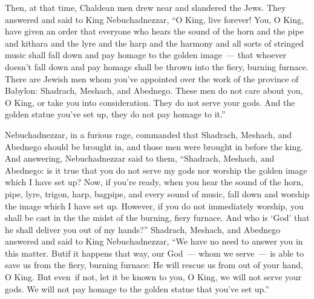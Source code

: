 \begin{inparaenum}
   Then, at that time, Chaldean men drew near and slandered the Jews.%
   They answered and said to King Nebuchadnezzar, ``O King, live forever!%
   You, O King, have given an order that everyone who hears the sound of the horn and the pipe and kithara and the lyre and the harp and the harmony and all sorts of stringed music shall fall down and pay homage to the golden image~---%
   that whoever doesn't fall down and pay homage shall be thrown into the fiery, burning furnace.%
   There are Jewish men whom you've appointed over the work of the province of Babylon: Shadrach, Meshach, and Abednego. These men do not care about you, O King, or take you into consideration. They do not serve your gods. And the golden statue you've set up, they do not pay homage to it.''\understood%
  
   Nebuchadnezzar, in a furious rage, commanded that Shadrach, Meshach, and Abednego should be brought in, and those men were brought in before the king.%
   And answering, Nebuchadnezzar said to them, ``Shadrach, Meshach, and Abednego: is it true that you do not serve my gods nor worship the golden image which I have set up?%
   Now, if you're ready, when you hear the sound of the horn, pipe, lyre, trigon, harp, bagpipe, and every sound of music, fall down and worship the image which I have set up. However, if you do not immediately worship, you shall be cast in the the midst of the burning, fiery furnace. And who is `God' that he shall deliver you out of my hands?''%
   Shadrach, Meshach, and Abednego answered and said to King Nebuchadnezzar, ``We have no need to answer you in this matter.%
   But\understood if it happens that way, our God~--- whom we serve~--- is able to save us from the fiery, burning furnace: He will rescue us from out of your hand, O King.%
   But even\understood\ if not, let it be known to you, O King, we will not serve your gods. We will not pay homage to the golden statue that you've set up.''%
  

\end{inparaenum}
